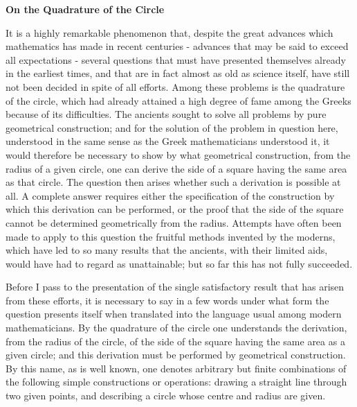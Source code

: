 \documentclass[11pt]{article}
\begin{document}
\begin{center}
{\Large\bfseries On the Quadrature of the Circle\par}
\vspace{0.8em}
\end{center}

It is a highly remarkable phenomenon that, despite the great advances which mathematics has made in recent centuries - advances that may be said to exceed all expectations - several questions that must have presented themselves already in the earliest times, and that are in fact almost as old as science itself, have still not been decided in spite of all efforts. Among these problems is the quadrature of the circle, which had already attained a high degree of fame among the Greeks because of its difficulties. The ancients sought to solve all problems by pure geometrical construction; and for the solution of the problem in question here, understood in the same sense as the Greek mathematicians understood it, it would therefore be necessary to show by what geometrical construction, from the radius of a given circle, one can derive the side of a square having the same area as that circle. The question then arises whether such a derivation is possible at all. A complete answer requires either the specification of the construction by which this derivation can be performed, or the proof that the side of the square cannot be determined geometrically from the radius. Attempts have often been made to apply to this question the fruitful methods invented by the moderns, which have led to so many results that the ancients, with their limited aids, would have had to regard as unattainable; but so far this has not fully succeeded.

Before I pass to the presentation of the single satisfactory result that has arisen from these efforts, it is necessary to say in a few words under what form the question presents itself when translated into the language usual among modern mathematicians. By the quadrature of the circle one understands the derivation, from the radius of the circle, of the side of the square having the same area as a given circle; and this derivation must be performed by geometrical construction. By this name, as is well known, one denotes arbitrary but finite combinations of the following simple constructions or operations: drawing a straight line through two given points, and describing a circle whose centre and radius are given.
\end{document}
